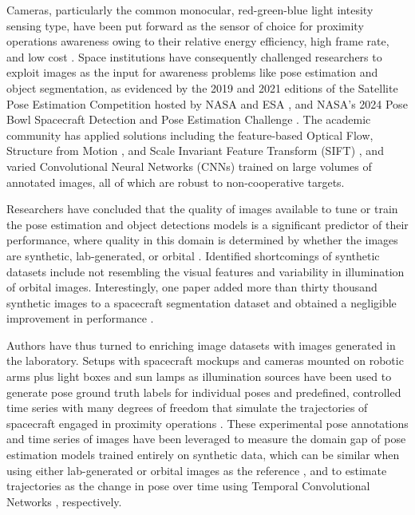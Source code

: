 \documentclass[11pt]{article}
\begin{document}
Cameras, particularly the common monocular, red-green-blue light intesity sensing type, have been put forward as the sensor of choice for proximity operations awareness owing to their relative energy efficiency, high frame rate, and low cost \cite{park2022speedplus, musallam2023cubesatcdt}.
Space institutions have consequently challenged researchers to exploit images as the input for awareness problems like pose estimation and object segmentation, as evidenced by the 2019 and 2021 editions of the Satellite Pose Estimation Competition hosted by NASA and ESA \cite{park2022speedplus}, and NASA's 2024 Pose Bowl Spacecraft Detection and Pose Estimation Challenge \cite{sam2026spacecraftsegmentation}.
The academic community has applied solutions including the feature-based Optical Flow, Structure from Motion \cite{faraco2024syntheticstereo}, and Scale Invariant Feature Transform (SIFT) \cite{faraco2024syntheticstereo}, and varied \cite{park2022speedplus, musallam2023cubesatcdt, sam2026spacecraftsegmentation} Convolutional Neural Networks (CNNs) trained on large volumes of annotated images, all of which are robust to non-cooperative targets.

Researchers have concluded that the quality of images available to tune or train the pose estimation and object detections models is a significant predictor of their performance, where quality in this domain is determined by whether the images are synthetic, lab-generated, or orbital \cite{park2022speedplus, musallam2023cubesatcdt, sam2026spacecraftsegmentation}.
Identified shortcomings of synthetic datasets include not resembling the visual features \cite {park2022speedplus, musallam2023cubesatcdt} and variability in illumination \cite{park2022speedplus, musallam2023cubesatcdt} of orbital images.
Interestingly, one paper added more than thirty thousand synthetic images to a spacecraft segmentation dataset and obtained a negligible improvement in performance \cite{sam2026spacecraftsegmentation}.

Authors have thus turned to enriching image datasets with images generated in the laboratory.
Setups with spacecraft mockups and cameras mounted on robotic arms plus light boxes and sun lamps as illumination sources have been used to generate pose ground truth labels for individual poses \cite{park2022speedplus} and predefined, controlled time series with many degrees of freedom that simulate the trajectories of spacecraft engaged in proximity operations \cite{musallam2023cubesatcdt}.
These experimental pose annotations and time series of images have been leveraged to measure the domain gap of pose estimation models trained entirely on synthetic data, which can be similar when using either lab-generated or orbital images as the reference \cite{park2022speedplus}, and to estimate trajectories as the change in pose over time using Temporal Convolutional Networks \cite{musallam2023cubesatcdt}, respectively.
\end{document}
